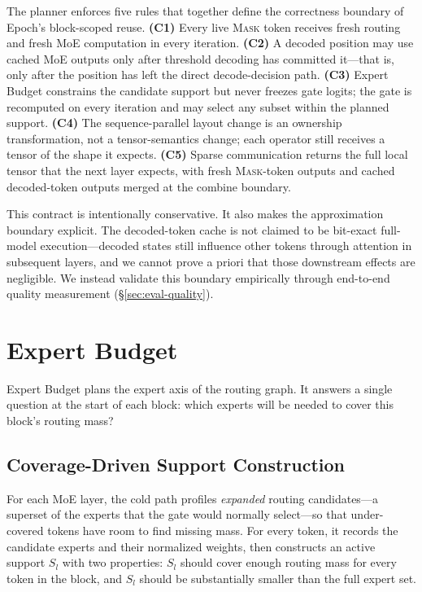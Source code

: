 \documentclass[sigconf,review,anonymous, 10pt]{acmart}
\newcommand{\sys}{Epoch}
\newcommand{\mask}{\textsc{Mask}}
\begin{document}
The planner enforces five rules that together define the correctness boundary of \sys{}'s block-scoped reuse.
\textbf{(C1)} Every live \mask{} token receives fresh routing and fresh MoE computation in every iteration.
\textbf{(C2)} A decoded position may use cached MoE outputs only after threshold decoding has committed it---that is, only after the position has left the direct decode-decision path.
\textbf{(C3)} Expert Budget constrains the candidate support but never freezes gate logits; the gate is recomputed on every iteration and may select any subset within the planned support.
\textbf{(C4)} The sequence-parallel layout change is an ownership transformation, not a tensor-semantics change; each operator still receives a tensor of the shape it expects.
\textbf{(C5)} Sparse communication returns the full local tensor that the next layer expects, with fresh \mask{}-token outputs and cached decoded-token outputs merged at the combine boundary.

This contract is intentionally conservative.
It also makes the approximation boundary explicit.
The decoded-token cache is not claimed to be bit-exact full-model execution---decoded states still influence other tokens through attention in subsequent layers, and we cannot prove a priori that those downstream effects are negligible.
We instead validate this boundary empirically through end-to-end quality measurement (\S\ref{sec:eval-quality}).

\section{Expert Budget}
\label{sec:expert-budget}

Expert Budget plans the expert axis of the routing graph.
It answers a single question at the start of each block: which experts will be needed to cover this block's routing mass?

\subsection{Coverage-Driven Support Construction}

For each MoE layer, the cold path profiles \emph{expanded} routing candidates---a superset of the experts that the gate would normally select---so that under-covered tokens have room to find missing mass.
For every token, it records the candidate experts and their normalized weights, then constructs an active support $S_l$ with two properties: $S_l$ should cover enough routing mass for every token in the block, and $S_l$ should be substantially smaller than the full expert set.
\end{document}
